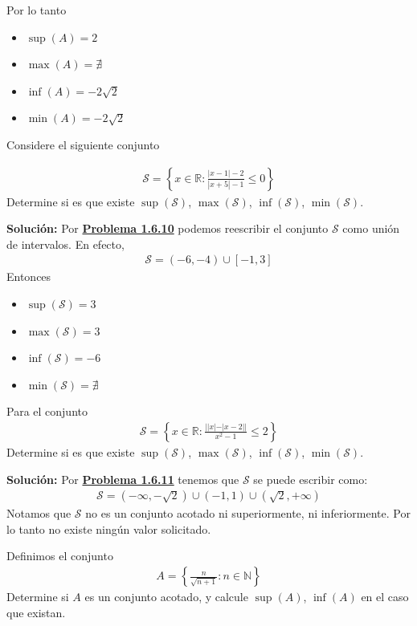 \documentclass[12pt]{book}
\begin{document}
Por lo tanto
\begin{itemize}
    \item $\sup(A)=2$
    \item $\max(A)= \nexists$
    \item $\inf(A)=-2\sqrt{2}$
    \item $\min(A)=-2\sqrt{2}$
\end{itemize}
\begin{prob}{}{}
    Considere el siguiente conjunto 

\begin{align*}
    \mathcal{S}= \left\{ x \in \mathbb{R} : \frac{|x-1|-2}{|x+5|-1} \leq 0\right\}
\end{align*}
Determine si es que existe $\sup(\mathcal{S})$, $\max(\mathcal{S})$, $\inf(\mathcal{S})$, $\min(\mathcal{S})$.
\end{prob}
\textbf{Solución:}
Por \hyperref[th:prob1.6.10]{\textbf{Problema 1.6.10}} podemos reescribir el conjunto $\mathcal{S}$ como unión de intervalos. En efecto,
\begin{align*}
    \mathcal{S}=(-6,-4) \cup [-1,3]
\end{align*}
Entonces 
\begin{itemize}
    \item $\sup(\mathcal{S})=3$
    \item $\max(\mathcal{S})=3$ 
    \item $\inf(\mathcal{S})=-6$
    \item $\min(\mathcal{S})=\nexists$
\end{itemize}
\begin{prob}{}{}
    Para el conjunto 
    \begin{align*}
 \mathcal{S}=\left\{x \in \mathbb{R}:   \frac{||x|-|x-2||}{x^2-1}\leq2 \right\}
\end{align*}
Determine si es que existe $\sup(\mathcal{S})$, $\max(\mathcal{S})$, $\inf(\mathcal{S})$, $\min(\mathcal{S})$.
\end{prob}
\textbf{Solución:} Por \hyperref[th:prob1.6.11]{\textbf{Problema 1.6.11}} tenemos que $\mathcal{S}$ se puede escribir como:
\begin{align*}
    \mathcal{S}=(-\infty,-\sqrt{2}) \cup (-1,1) \cup (\sqrt{2},+\infty)
\end{align*}
Notamos que $\mathcal{S}$ no es un conjunto acotado ni superiormente, ni inferiormente. Por lo tanto no existe ningún valor solicitado.
\begin{prob}{}{}
Definimos el conjunto 
\begin{align*}
    A=\left\{ \frac{n}{\sqrt{n+1}} :n \in \mathbb{N}\right\}
\end{align*}
Determine si $A$ es un conjunto acotado, y calcule $\sup(A)$, $\inf(A)$ en el caso que existan.
\end{prob}
\end{document}
